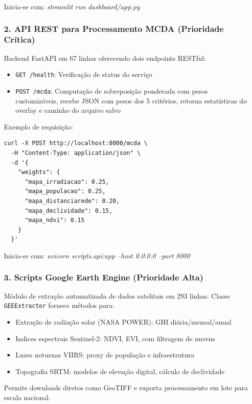 \documentclass[12pt, a4paper]{article}
\begin{document}
{{{{{{{{{{{{Inicia-se com: \textit{streamlit run dashboard/app.py}

\subsubsection{2. API REST para Processamento MCDA (Prioridade Crítica)}

Backend FastAPI em 67 linhas oferecendo dois endpoints RESTful:

\begin{itemize}
    \item \texttt{GET /health}: Verificação de status do serviço
    \item \texttt{POST /mcda}: Computação de sobreposição ponderada com pesos customizáveis, recebe JSON com pesos dos 5 critérios, retorna estatísticas do overlay e caminho do arquivo salvo
\end{itemize}

Exemplo de requisição:
\begin{verbatim}
curl -X POST http://localhost:8000/mcda \
  -H "Content-Type: application/json" \
  -d '{
    "weights": {
      "mapa_irradiacao": 0.25,
      "mapa_populacao": 0.25,
      "mapa_distanciarede": 0.20,
      "mapa_declividade": 0.15,
      "mapa_ndvi": 0.15
    }
  }'
\end{verbatim}

Inicia-se com: \textit{uvicorn scripts.api:app --host 0.0.0.0 --port 8000}

\subsubsection{3. Scripts Google Earth Engine (Prioridade Alta)}

Módulo de extração automatizada de dados satelitais em 293 linhas. Classe \texttt{GEEExtractor} fornece métodos para:

\begin{itemize}
    \item Extração de radiação solar (NASA POWER): GHI diária/mensal/anual
    \item Indices espectrais Sentinel-2: NDVI, EVI, com filtragem de nuvens
    \item Luzes noturnas VIIRS: proxy de população e infraestrutura
    \item Topografia SRTM: modelos de elevação digital, cálculo de declividade
\end{itemize}

Permite downloads diretos como GeoTIFF e suporta processamento em lote para escala nacional.

}}}}}}}}}}}}
\end{document}
